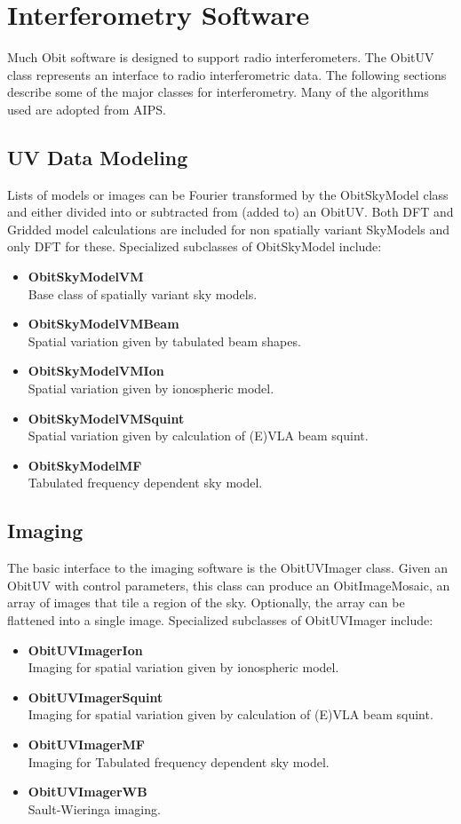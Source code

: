 \documentclass[11pt]{article}
\begin{document}
\section{Interferometry Software}
   Much Obit software  is designed to support radio interferometers.
The ObitUV class represents an interface to radio interferometric
data.
The following sections describe some of the major classes for
interferometry.
Many of the algorithms used are adopted from AIPS.

\subsection{UV Data Modeling}
Lists of models or images can be Fourier transformed by the
ObitSkyModel class and either divided into or subtracted from (added
to) an ObitUV.
Both DFT and Gridded model calculations are included for non spatially
variant SkyModels and only DFT for these.
Specialized subclasses of ObitSkyModel include:
\begin{itemize}
\item {\bf ObitSkyModelVM} \\
Base class of spatially variant sky models.
\item {\bf ObitSkyModelVMBeam} \\
Spatial variation given by tabulated beam shapes.
\item {\bf ObitSkyModelVMIon} \\
Spatial variation given by ionospheric model.
\item {\bf ObitSkyModelVMSquint} \\
Spatial variation given by calculation of (E)VLA beam squint.
\item {\bf ObitSkyModelMF } \\
Tabulated frequency dependent sky model.
\end{itemize}

\subsection{Imaging}
   The basic interface to the imaging software is the ObitUVImager
class. 
Given an ObitUV with control parameters, this class can produce an
ObitImageMosaic, an array of images that tile a region of the sky.
Optionally, the array can be flattened into a single image.
Specialized subclasses of ObitUVImager include:
\begin{itemize}
\item {\bf ObitUVImagerIon} \\
Imaging for spatial variation given by ionospheric model.
\item {\bf ObitUVImagerSquint} \\
Imaging for spatial variation given by calculation of (E)VLA beam squint.
\item {\bf ObitUVImagerMF} \\
Imaging for Tabulated frequency dependent sky model.
\item {\bf ObitUVImagerWB} \\
Sault-Wieringa imaging.
\end{itemize}
\end{document}
